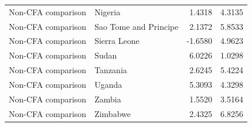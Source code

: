 \begin{table}
\begin{tabular}[t]{llrr}
Non-CFA comparison & Nigeria & 1.4318 & 4.3135\\
Non-CFA comparison & Sao Tome and Principe & 2.1372 & 5.8533\\
Non-CFA comparison & Sierra Leone & -1.6580 & 4.9623\\
\addlinespace
Non-CFA comparison & Sudan & 6.0226 & 1.0298\\
Non-CFA comparison & Tanzania & 2.6245 & 5.4224\\
Non-CFA comparison & Uganda & 5.3093 & 4.3298\\
Non-CFA comparison & Zambia & 1.5520 & 3.5164\\
Non-CFA comparison & Zimbabwe & 2.4325 & 6.8256\\
\bottomrule
\end{tabular}
\end{table}